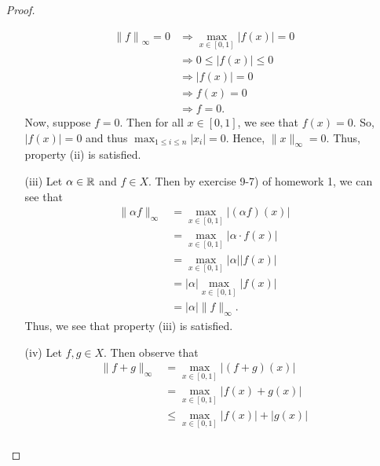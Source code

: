 \documentclass{article}
\begin{document}
\begin{enumerate}
\begin{proof}
\begin{enumerate}
                \begin{align*}
                    {\|f\|}_{\infty } = 0 &\Longrightarrow \max_{x \in [0,1]} | f(x) |  = 0  \\
                                          &\Longrightarrow  0 \leq  | f(x) | \leq 0 \tag{\( \forall x \in [0,1] \)} \\
                                          &\Longrightarrow | f(x) |  = 0 \tag{\( \forall   x \in [0,1] \)} \\
                                          &\Longrightarrow f(x) = 0 \tag{\( \forall x \in [0,1] \)} \\
                                          &\Longrightarrow f = 0. 
                \end{align*}
                Now, suppose \( f = 0  \). Then for all \( x \in [0,1] \), we see that \( f(x) = 0 \). So, \( | f(x) | = 0   \) and thus \( \max_{1 \leq i \leq n} | {x}_{i}  |  = 0  \). Hence, \( \|x\|_{\infty} = 0  \).
                Thus, property (ii) is satisfied.
            \item[(iii)] Let \( \alpha \in \mathbb{R}  \) and \( f \in X  \). Then by exercise 9-7) of homework 1, we can see that 
                \begin{align*}
                    \|\alpha f \|_{\infty } &= \max_{x \in [0,1]} | (\alpha f)(x) |  \\
                                            &= \max_{x \in [0,1]} | \alpha \cdot f(x) | \\
                                            &= \max_{x \in [0,1]} | \alpha | | f(x) | \tag{Problem 1} \\
                                            &= | \alpha | \max_{x \in [0,1]} | f(x) | \tag{Problem 9-7) of hw1} \\
                                            &= | \alpha |  \|f\|_{\infty }.
                \end{align*}
                Thus, we see that property (iii) is satisfied.
            \item[(iv)] Let \( f,g \in X  \). Then observe that  
                \begin{align*}
                    \|f + g\|_{\infty } &= \max_{x \in [0,1]} | (f + g)(x) |  \\
                                        &= \max_{x \in [0,1]} | f(x) + g(x) | \\
                                        &\leq \max_{x \in [0,1]} | f(x) |  + | g(x) | \tag{Triangle Inequality} \\

\end{align*}
\end{enumerate}
\end{proof}
\end{enumerate}
\end{document}
